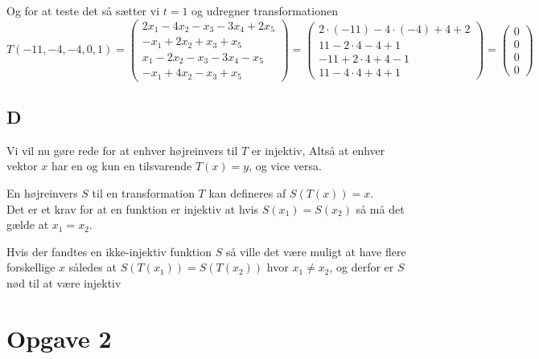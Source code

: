 \documentclass[11pt]{article}
\begin{document}
    Og for at teste det så sætter vi \(t=1\) og udregner transformationen
\[ 
T(-11,-4,-4,0,1) = 
\begin{pmatrix} 
2x_1-4x_2-x_3-3x_4+2x_5\\
-x_1+2x_2+x_3+x_5\\
x_1-2x_2-x_3-3x_4-x_5\\
-x_1+4x_2-x_3+x_5
\end{pmatrix} = \begin{pmatrix} 
2\cdot(-11)-4\cdot(-4)+4+2\\
11-2\cdot 4 -4+1\\
-11+2\cdot 4+ 4 -1\\
11-4\cdot4+4+1
\end{pmatrix} = \begin{pmatrix} 
0\\
0\\
0\\
0
\end{pmatrix}\]

    \hypertarget{d}{%
\subsection{D}\label{d}}

Vi vil nu gøre rede for at enhver højreinvers til \(T\) er injektiv,
Altså at enhver vektor \(x\) har en og kun en tilsvarende \(T(x) = y\),
og vice versa.

En højreinvers \(S\) til en transformation \(T\) kan defineres af
\(S(T(x)) = x\).\\
Det er et krav for at en funktion er injektiv at hvis
\(S(x_1) = S(x_2)\) så må det gælde at \(x_1 = x_2\).

Hvis der fandtes en ikke-injektiv funktion \(S\) så ville det være
muligt at have flere forskellige \(x\) således at
\(S(T(x_1)) = S(T(x_2))\) hvor \(x_1 \neq x_2\), og derfor er \(S\) nød
til at være injektiv


    
\maketitle
    
    

    
\hypertarget{opgave-2}{%
\section{Opgave 2}\label{opgave-2}}
\end{document}
